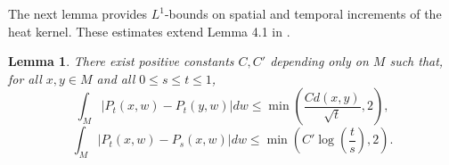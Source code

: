\documentclass[12pt]{amsart}
\newtheorem{lemma}{Lemma}[section]
\numberwithin{equation}{section}
\newcommand{\1}{\mathbf{1}}
\begin{document}
The next lemma provides $L^1$-bounds on spatial and temporal increments of the heat kernel. These estimates extend Lemma 4.1 in \cite{chen2025small}.
\begin{lemma}
\label{heat_kernel_integral_bounds}
    There exist positive constants $C,C'$ depending only on $M$ such that, for all $x,y\in M$ and all $0\leq s\leq t\leq 1$,
    \begin{equation}
    \label{heat_kernel_spatial_integral_bound}
        \int_M\vert P_t(x,w)-P_t(y,w)\vert dw\leq \min\left(\frac{Cd(x,y)}{\sqrt{t}},2\right),
    \end{equation}
    \begin{equation}
    \label{heat_kernel_temporal_integral_bound}
        \int_M\vert P_t(x,w)-P_s(x,w)\vert dw\leq \min\left(C'\log\left(\frac{t}{s}\right),2\right).
    \end{equation}
\end{lemma}
\end{document}
